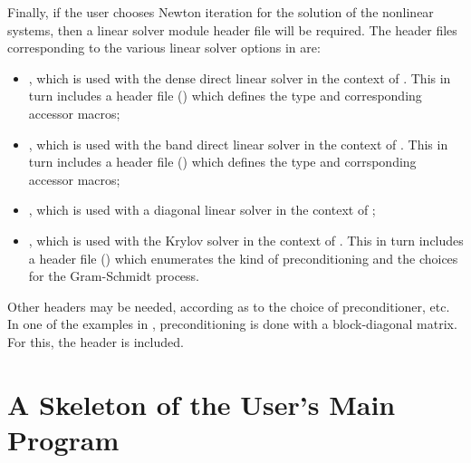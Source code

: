 Finally, if the user chooses Newton iteration for the solution of the nonlinear systems,
then a linear solver module header file will be required. 
The header files corresponding to the various linear solver options in {\cvodes} are:
%
\begin{itemize}
\item {}, 
  which is used with the dense direct linear solver in 
  the context of {\cvodes}. This in turn includes a header file ()
  which defines the  type and corresponding accessor macros; 
\item {}, 
  which is used with the band direct linear solver in the
  context of {\cvodes}. This in turn includes a header file ()
  which defines the  type and corrsponding accessor macros;
\item {}, which is used with a diagonal linear solver in the
  context of {\cvodes};
\item {}, 
  which is used with the Krylov solver {\spgmr} in the
  context of {\cvodes}. This in turn includes a header file ()
  which enumerates the kind of preconditioning and the choices for the
  Gram-Schmidt process.
\end{itemize}

Other headers may be needed, according as to the choice of
preconditioner, etc. In one of the examples in \cite{}, preconditioning
is done with a block-diagonal matrix. For this, the header
 is included.


\section{A Skeleton of the User's Main Program}\label{s:skeleton_sim}

